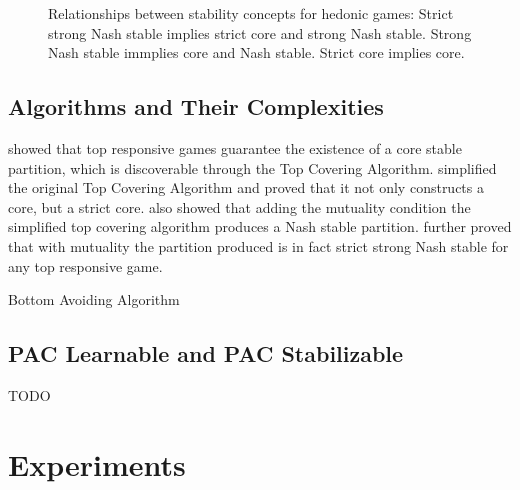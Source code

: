 \documentclass[letterpaper]{article} %
\begin{document}
\begin{figure}
\centering
{}
\caption{Relationships between stability concepts for hedonic games: Strict strong Nash stable implies strict core and strong Nash stable. Strong Nash stable immplies core and Nash stable. Strict core implies core.}
\end{figure}

\subsection{Algorithms and Their Complexities}

\cite{ALCALDE2004869} showed that top responsive games guarantee the existence of a core stable partition, which is discoverable through the Top Covering Algorithm. \cite{DIMITROV2007130} simplified the original Top Covering Algorithm and proved that it not only constructs a core, but a strict core. \cite{Dimitrov2006TopRA} also showed that adding the mutuality condition the simplified top covering algorithm produces a Nash stable partition. \cite{Aziz:2012:ESH:2343776.2343806} further proved that with mutuality the partition produced is in fact strict strong Nash stable for any top responsive game.

Bottom Avoiding Algorithm

\subsection{PAC Learnable and PAC Stabilizable}
TODO

\section{Experiments}
\end{document}

